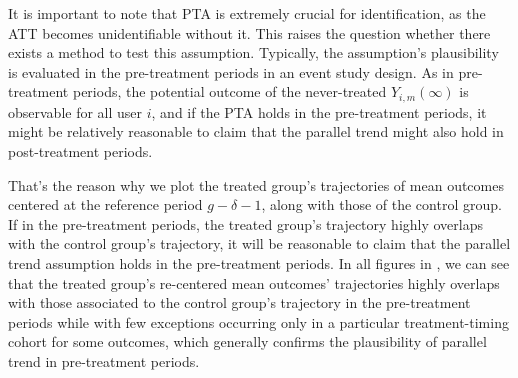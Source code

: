 



It is important to note that PTA is extremely crucial for identification, as the ATT becomes unidentifiable without it. This raises the question whether there exists a method to test this assumption.
Typically, the assumption's plausibility is evaluated in the pre-treatment periods in an event study design. As in pre-treatment periods, the potential outcome of the never-treated $Y_{i, m}(\infty)$ is observable for all user $i$, and if the PTA holds in the pre-treatment periods, it might be relatively reasonable to claim that the parallel trend might also hold in post-treatment periods.

That's the reason why we plot the treated group's trajectories of mean outcomes centered at the reference period $g-\delta-1$, along with those of the control group. If in the pre-treatment periods, the treated group's trajectory highly overlaps with the control group's trajectory, it will be reasonable to claim that the parallel trend assumption holds in the pre-treatment periods. In all figures in , we can see that the treated group's re-centered mean outcomes' trajectories highly overlaps with those associated to the control group's trajectory in the pre-treatment periods while with few exceptions occurring only in a particular treatment-timing cohort for some outcomes, which generally confirms the plausibility of parallel trend in pre-treatment periods.

